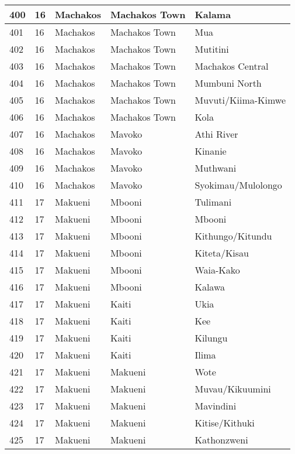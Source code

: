 \begin{table}[!ht]
\begin{tabular}{|l|l|l|l|l|}
        400 & 16 & Machakos & Machakos Town & Kalama \\ \hline
        401 & 16 & Machakos & Machakos Town & Mua \\ \hline
        402 & 16 & Machakos & Machakos Town & Mutitini \\ \hline
        403 & 16 & Machakos & Machakos Town & Machakos Central \\ \hline
        404 & 16 & Machakos & Machakos Town & Mumbuni North \\ \hline
        405 & 16 & Machakos & Machakos Town & Muvuti/Kiima-Kimwe \\ \hline
        406 & 16 & Machakos & Machakos Town & Kola \\ \hline
        407 & 16 & Machakos & Mavoko & Athi River \\ \hline
        408 & 16 & Machakos & Mavoko & Kinanie \\ \hline
        409 & 16 & Machakos & Mavoko & Muthwani \\ \hline
        410 & 16 & Machakos & Mavoko & Syokimau/Mulolongo \\ \hline
        411 & 17 & Makueni & Mbooni & Tulimani \\ \hline
        412 & 17 & Makueni & Mbooni & Mbooni \\ \hline
        413 & 17 & Makueni & Mbooni & Kithungo/Kitundu \\ \hline
        414 & 17 & Makueni & Mbooni & Kiteta/Kisau \\ \hline
        415 & 17 & Makueni & Mbooni & Waia-Kako \\ \hline
        416 & 17 & Makueni & Mbooni & Kalawa \\ \hline
        417 & 17 & Makueni & Kaiti & Ukia \\ \hline
        418 & 17 & Makueni & Kaiti & Kee \\ \hline
        419 & 17 & Makueni & Kaiti & Kilungu \\ \hline
        420 & 17 & Makueni & Kaiti & Ilima \\ \hline
        421 & 17 & Makueni & Makueni & Wote \\ \hline
        422 & 17 & Makueni & Makueni & Muvau/Kikuumini \\ \hline
        423 & 17 & Makueni & Makueni & Mavindini \\ \hline
        424 & 17 & Makueni & Makueni & Kitise/Kithuki \\ \hline
        425 & 17 & Makueni & Makueni & Kathonzweni \\ \hline

\end{tabular}
\end{table}
